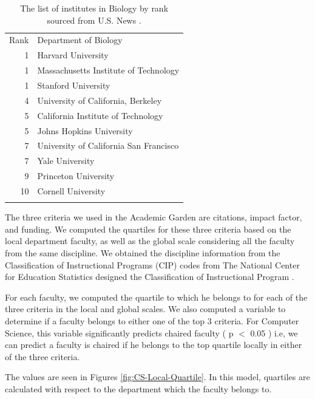 \begin{table}
\centering
\caption{The list of institutes in Biology by rank sourced from U.S. News \cite{usnews}.}
\label{tab:}       %
\begin{tabular}{rl}
\hline\noalign{\smallskip}
Rank & Department of Biology  \\
\noalign{\smallskip}\hline\noalign{\smallskip}
1 & Harvard University \\
1 & Massachusetts Institute of Technology \\
1 & Stanford University \\
4 & University of California, Berkeley \\
5 & California Institute of Technology \\
5 & Johns Hopkins University \\
7 & University of California San Francisco \\
7 & Yale University \\
9 & Princeton University \\
10 & Cornell University \\

\noalign{\smallskip}\hline
\end{tabular}
\end{table}

The three criteria we used in the Academic Garden are citations, impact factor, and funding. We computed the quartiles for these three criteria based on the local department faculty, as well as the global scale considering all the faculty from the same discipline. We obtained the discipline information from the Classification of Instructional Programs (CIP) codes from The National Center for Education Statistics designed the Classification of Instructional Program \cite{CIPus76:online}.


For each faculty, we computed the quartile to which he belongs to for each of the three criteria in the local and global scales. We also computed a variable to determine if a faculty belongs to either one of the top 3 criteria.
For Computer Science, this variable significantly predicts chaired faculty ( p $<$ 0.05 ) i.e, we can predict a faculty is chaired if he belongs to the top quartile locally in either of the three criteria.

The values are seen in Figures \ref{fig:CS-Local-Quartile}. In this model, quartiles are calculated with respect to the department which the faculty belongs to.

